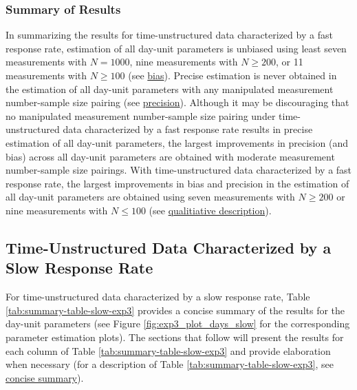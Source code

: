 \documentclass[
12pt, %
twoside,
english]{guelphthesis}
\theoremstyle{definition}
\theoremstyle{definition}
\theoremstyle{definition}
\theoremstyle{definition}
\theoremstyle{remark}
\begin{document}
\hypertarget{summary-of-results-9}{%
\subsubsection{Summary of Results}\label{summary-of-results-9}}

In summarizing the results for time-unstructured data characterized by a fast response rate, estimation of all day-unit parameters is unbiased using least seven measurements with \(N = 1000\), nine measurements with \(N \ge 200\), or 11 measurements with \(N \ge 100\) (see \protect\hyperlink{bias-fast-exp3}{bias}). Precise estimation is never obtained in the estimation of all day-unit parameters with any manipulated measurement number-sample size pairing (see \protect\hyperlink{precision-fast-exp3}{precision}). Although it may be discouraging that no manipulated measurement number-sample size pairing under time-unstructured data characterized by a fast response rate results in precise estimation of all day-unit parameters, the largest improvements in precision (and bias) across all day-unit parameters are obtained with moderate measurement number-sample size pairings. With time-unstructured data characterized by a fast response rate, the largest improvements in bias and precision in the estimation of all day-unit parameters are obtained using seven measurements with \(N \ge 200\) or nine measurements with \(N \le 100\) (see \protect\hyperlink{qualitative-fast-exp3}{qualitiative description}).

\hypertarget{time-unstructured-data-characterized-by-a-slow-response-rate}{%
\subsection{Time-Unstructured Data Characterized by a Slow Response Rate}\label{time-unstructured-data-characterized-by-a-slow-response-rate}}

For time-unstructured data characterized by a slow response rate, Table \ref{tab:summary-table-slow-exp3} provides a concise summary of the results for the day-unit parameters (see Figure \ref{fig:exp3_plot_days_slow} for the corresponding parameter estimation plots). The sections that follow will present the results for each column of Table \ref{tab:summary-table-slow-exp3} and provide elaboration when necessary (for a description of Table \ref{tab:summary-table-slow-exp3}, see \protect\hyperlink{concise-example-exp3}{concise summary}).
\end{document}
